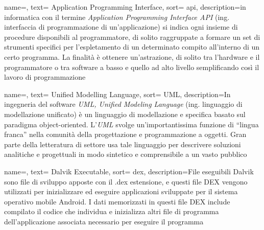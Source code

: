 \renewcommand{\acronymname}{Acronimi e abbreviazioni}

{
name=,
text= Application Programming Interface,
sort= api,
description={in informatica con il termine \emph{Application Programming Interface API} (ing. interfaccia di programmazione di un'applicazione) si indica ogni insieme di procedure disponibili al programmatore, di solito raggruppate a formare un set di strumenti specifici per l'espletamento di un determinato compito all'interno di un certo programma. La finalità è ottenere un'astrazione, di solito tra l'hardware e il programmatore o tra software a basso e quello ad alto livello semplificando così il lavoro di programmazione}
}

{
name=,
text= Unified Modelling Language,
sort= UML,
description={In ingegneria del software \emph{UML, Unified Modeling Language} (ing. linguaggio di modellazione unificato) è un linguaggio di modellazione e specifica basato sul paradigma object-oriented. L'\emph{UML} svolge un'importantissima funzione di ``lingua franca'' nella comunità della progettazione e programmazione a oggetti. Gran parte della letteratura di settore usa tale linguaggio per descrivere soluzioni analitiche e progettuali in modo sintetico e comprensibile a un vasto pubblico}
}


{
name=,
text= Dalvik Executable,
sort= dex,
description={File eseguibili Dalvik sono file di sviluppo apposte con il .dex estensione, e questi file DEX vengono utilizzati per inizializzare ed eseguire applicazioni sviluppate per il sistema operativo mobile Android.
I dati memorizzati in questi file DEX include compilato il codice che individua e inizializza altri file di programma dell'applicazione associata necessario per eseguire il programma}
}

